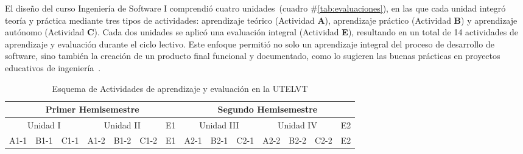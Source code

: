 \documentclass[12pt]{article}
\begin{document}
\begin{multicols}{2}
El diseño del curso Ingeniería de Software I comprendió cuatro unidades~(cuadro \#\ref{tab:evaluaciones}), en las que cada unidad integró teoría y práctica mediante tres tipos de actividades: aprendizaje teórico (Actividad \textbf{A}), aprendizaje práctico (Actividad \textbf{B}) y aprendizaje autónomo (Actividad \textbf{C}). Cada dos unidades se aplicó una evaluación integral (Actividad \textbf{E}), resultando en un total de 14 actividades de aprendizaje y evaluación durante el ciclo lectivo. Este enfoque permitió no solo un aprendizaje integral del proceso de desarrollo de software, sino también la creación de un producto final funcional y documentado, como lo sugieren las buenas prácticas en proyectos educativos de ingeniería~\cite{felder2005teaching, hughes2017agile}.  

\end{multicols}

\noindent

\begin{table}[H]
  \centering
\begin{tabular}{|lll|lll|l|lll|lll|l|}
  \hline
  \multicolumn{7}{|c|}{Primer Hemisemestre}&\multicolumn{7}{c|}{Segundo Hemisemestre} \\ \hline
  \multicolumn{3}{|c|}{Unidad I}&\multicolumn{3}{c|}{Unidad II}&E1 &\multicolumn{3}{c|}{Unidad III}&\multicolumn{3}{c|}{Unidad IV}&E2 \\ \hline

  
  A1-1&B1-1&C1-1&A1-2&B1-2&C1-2&E1&A2-1&B2-1&C2-1&A2-2&B2-2&C2-2&E2 \\ \hline
\end{tabular}
    
  \caption{Esquema de Actividades de aprendizaje y evaluación en la UTELVT}
\end{table}
  
\end{document}
